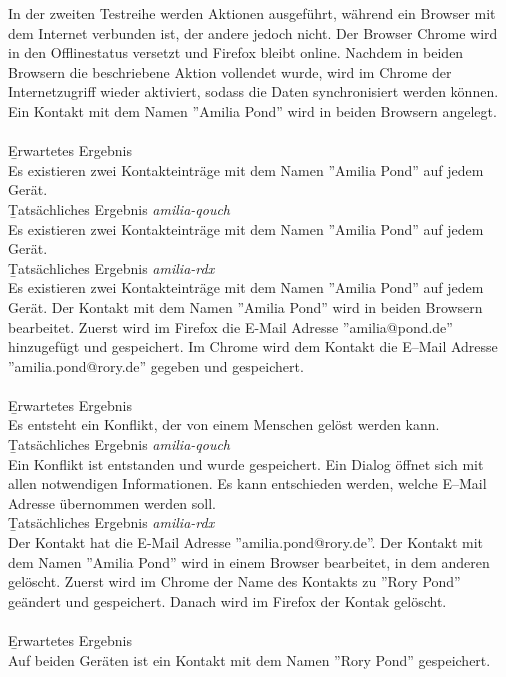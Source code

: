 In der zweiten Testreihe werden Aktionen ausgeführt, während ein Browser mit dem Internet verbunden ist, der andere jedoch nicht.
Der Browser Chrome wird in den Offlinestatus versetzt und Firefox bleibt online.
Nachdem in beiden Browsern die beschriebene Aktion vollendet wurde, wird im Chrome der Internetzugriff wieder aktiviert, sodass die Daten synchronisiert werden können. 
% 
Ein Kontakt mit dem Namen ''Amilia Pond'' wird in beiden Browsern angelegt.\\\\
\b{Erwartetes Ergebnis}\\
Es existieren zwei Kontakteinträge mit dem Namen ''Amilia Pond'' auf jedem Gerät.\\
\b{Tatsächliches Ergebnis \it{amilia-qouch}}\\
Es existieren zwei Kontakteinträge mit dem Namen ''Amilia Pond'' auf jedem Gerät.\\
\b{Tatsächliches Ergebnis \it{amilia-rdx}}\\
Es existieren zwei Kontakteinträge mit dem Namen ''Amilia Pond'' auf jedem Gerät.
%
Der Kontakt mit dem Namen ''Amilia Pond'' wird in beiden Browsern bearbeitet.
Zuerst wird im Firefox die E-Mail Adresse ''amilia@pond.de'' hinzugefügt und gespeichert.
Im Chrome wird dem Kontakt die E--Mail Adresse ''amilia.pond@rory.de'' gegeben und gespeichert.\\\\
\b{Erwartetes Ergebnis}\\
Es entsteht ein Konflikt, der von einem Menschen gelöst werden kann.\\
\b{Tatsächliches Ergebnis \it{amilia-qouch}}\\
Ein Konflikt ist entstanden und wurde gespeichert. Ein Dialog öffnet sich mit allen notwendigen Informationen.
Es kann entschieden werden, welche E--Mail Adresse übernommen werden soll.\\
\b{Tatsächliches Ergebnis \it{amilia-rdx}}\\
Der Kontakt hat die E-Mail Adresse ''amilia.pond@rory.de''.
%
%
Der Kontakt mit dem Namen ''Amilia Pond'' wird in einem Browser bearbeitet, in dem anderen gelöscht.
Zuerst wird im Chrome der Name des Kontakts zu ''Rory Pond'' geändert und gespeichert.
Danach wird im Firefox der Kontak gelöscht.\\\\
\b{Erwartetes Ergebnis}\\
Auf beiden Geräten ist ein Kontakt mit dem Namen ''Rory Pond'' gespeichert.\\
